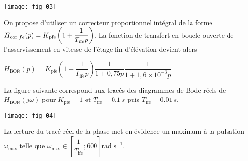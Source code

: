 \begin{marginfigure}
\texttt{[image: fig\_03]}
\end{marginfigure}


On propose d’utiliser un correcteur proportionnel intégral de la forme $H_{\text{cor }fe}(p)=K_{\text{\text{pfe}}}\left(1+\dfrac{1}{T_{\text{ife}}p}\right)$. La fonction de transfert en boucle ouverte de l’asservissement en vitesse de l’étage fin d’élévation devient alors 

$
H_{\text{BOfe}}(p)=K_{\text{pfe}}\left( 1+\dfrac{1}{T_{\text{ife}}p}\right) \dfrac{1}{1+0,75p} \dfrac{1}{1+1,6\times 10^{-3}p}
$.

La figure suivante correspond aux tracés des diagrammes de Bode réels de $H_{\text{BOfe}}(j\omega)$ 
pour $K_{\text{pfe}}=1$ et $T_{\text{ife}}=\SI{0,1}{s}$ puis $T_{\text{ife}}=\SI{0,01}{s}$.


\begin{marginfigure}
\texttt{[image: fig\_04]}
\end{marginfigure}


\ifprof
\begin{corrige}
\end{corrige}
\else
\fi

La lecture du tracé réel de la phase met en évidence un maximum à la pulsation $\omega_{\text{max}}$ telle que $\omega_{\text{max}}\in \left[\dfrac{1}{T_{\text{ife}}};600 \right]\text{rad s}^{-1}$.

\ifprof
\begin{corrige}
\end{corrige}
\else
\fi

\ifprof
\begin{corrige}
\end{corrige}
\else
\fi


